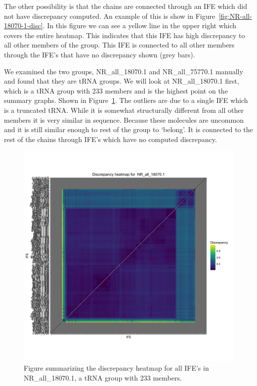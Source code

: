 The other possibility is that the chains are connected through an IFE which did
not have discrepancy computed. An example of this is show in
Figure~\ref{fig:NR-all-18070-1-disc}. In this figure we can see a yellow line in
the upper right which covers the entire heatmap. This indicates that this IFE
has high discrepancy to all other members of the group. This IFE is connected to
all other members through the IFE’s that have no discrepancy shown (grey bars).

We examined the two groups, NR\_all\_18070.1 and NR\_all\_75770.1 manually and found
that they are tRNA groups. We will look at NR\_all\_18070.1 first, which is a tRNA
group with 233 members and is the highest point on the summary graphs. Shown in
Figure~\ref{fig:nr-all-18070.1-disc}. The outliers are due to a single IFE which is a
truncated tRNA. While it is somewhat structurally different from all other
members it is very similar in sequence. Because these molecules are uncommon and
it is still similar enough to rest of the group to ‘belong’. It is connected to
the rest of the chains through IFE’s which have no computed discrepancy.

\begin{figure}[h]
        \includegraphics[width=\textwidth]{chapter-3/figs/nr-all-18070-1-disc}
  \caption{Figure summarizing the discrepancy heatmap for all IFE’s in
  NR\_all\_18070.1, a tRNA group with 233 members. }
  \label{fig:nr-all-18070.1-disc}
\end{figure}


